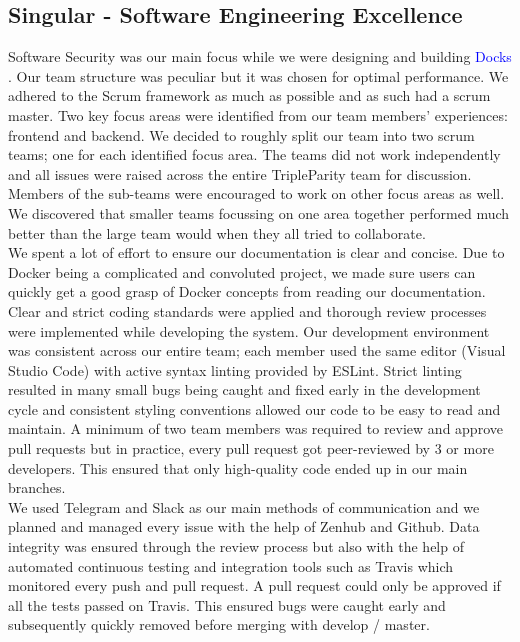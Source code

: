 \documentclass[]{article}
\newcommand{\docks}{\textcolor{Blue}{Docks} }
\newcommand{\docker}{Docker }
\begin{document}
\subsection{Singular - Software Engineering Excellence}
Software Security was our main focus while we were designing and building \docks.
Our team structure was peculiar but it was chosen for optimal performance. We adhered to the Scrum 
framework as much as possible and as such had a scrum master. Two key focus areas were identified from our team members' experiences: frontend and backend. We decided to roughly split our team into two scrum teams; one for each identified focus area. The teams did not work independently and all issues were raised across the entire TripleParity team for discussion. Members of the sub-teams were encouraged to work on other focus areas as well. We discovered that smaller teams focussing on one area together performed much better than the large team would when they all tried to collaborate. \\

We spent a lot of effort to ensure our documentation is clear and concise. Due to \docker being a complicated and convoluted project, we made sure users can quickly get a good grasp of \docker concepts from reading our documentation. Clear and strict coding standards were applied and thorough review processes were implemented while developing the system. Our development environment was consistent across our entire team; each member used the same editor (Visual Studio Code) with active syntax linting provided by ESLint. Strict linting resulted in many small bugs being caught and fixed early in the development cycle and consistent styling conventions allowed our code to be easy to read and maintain. A minimum of two team members was required to review and approve pull requests but in practice, every pull request got peer-reviewed by 3 or more developers. This ensured that only high-quality code ended up in our main branches. \\

We used Telegram and Slack as our main methods of communication and we planned and
managed every issue with the help of Zenhub and Github. Data integrity was ensured through the review process but also with the help of automated continuous testing and integration tools such as  Travis which monitored every push and pull request. A pull request could only be approved if all the tests passed on Travis. This ensured bugs were caught early and subsequently quickly removed before merging with develop / master.
\end{document}
